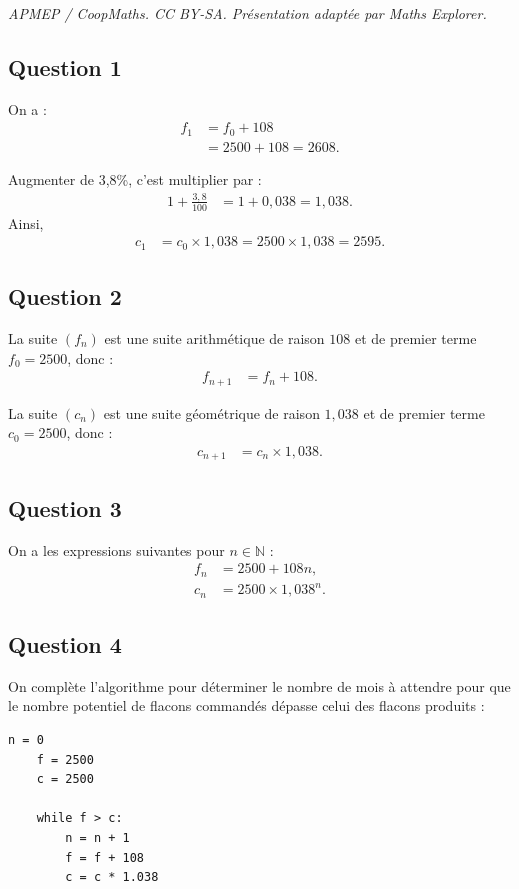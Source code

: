 \documentclass[10pt]{article}
\begin{document}
\noindent\textit{APMEP / CoopMaths. CC BY-SA. Présentation adaptée par Maths Explorer.}\par\medskip
\subsection*{Question 1}

On a :
\begin{align*}
	f_1 &= f_0 + 108 \\
	&= 2500 + 108 = 2608.
\end{align*}

Augmenter de 3,8\%, c'est multiplier par :
\begin{align*}
	1 + \frac{3,8}{100} &= 1 + 0,038 = 1,038.
\end{align*}
Ainsi, 
\begin{align*}
	c_1 &= c_0 \times 1,038 = 2500 \times 1,038 = 2595.
\end{align*}

\subsection*{Question 2}

La suite $(f_n)$ est une suite arithmétique de raison $108$ et de premier terme $f_0 = 2500$, donc :
\begin{align*}
	f_{n+1} &= f_n + 108.
\end{align*}

La suite $(c_n)$ est une suite géométrique de raison $1,038$ et de premier terme $c_0 = 2500$, donc :
\begin{align*}
	c_{n+1} &= c_n \times 1,038.
\end{align*}

\subsection*{Question 3}

On a les expressions suivantes pour $n \in \mathbb{N}$ :
\begin{align*}
	f_n &= 2500 + 108n, \\
	c_n &= 2500 \times 1,038^n.
\end{align*}

\subsection*{Question 4}

On complète l'algorithme pour déterminer le nombre de mois à attendre pour que le nombre potentiel de flacons commandés dépasse celui des flacons produits :
\begin{lstlisting}[style=python]
	n = 0
	f = 2500
	c = 2500
	
	while f > c:
		n = n + 1
		f = f + 108
		c = c * 1.038
\end{lstlisting}
\end{document}
